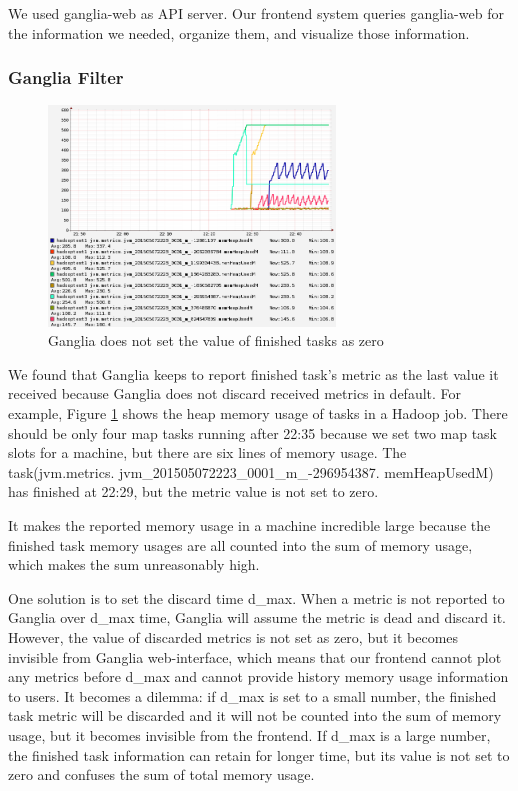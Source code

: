 We used ganglia-web as API server. Our frontend system queries ganglia-web for the information we needed, organize them, and visualize those information. 

\subsubsection{Ganglia Filter}

\begin{figure}[ht]
  \centering
    \includegraphics[width=3.0in]{image/ganglia_finished_tasks.png}
    \caption{Ganglia does not set the value of finished tasks as zero}
    \label{ref:gangliah_bug}
\end{figure}

We found that Ganglia keeps to report finished task's metric as the last value it received because Ganglia does not discard received metrics in default. For example, Figure \ref{ref:gangliah_bug} shows the heap memory usage of tasks in a Hadoop job. There should be only four map tasks running after 22:35 because we set two map task slots for a machine, but there are six lines of memory usage. The task(jvm.metrics. jvm\_201505072223\_0001\_m\_-296954387. memHeapUsedM) has finished at 22:29, but the metric value is not set to zero.

It makes the reported memory usage in a machine incredible large because the finished task memory usages are all counted into the sum of memory usage, which makes the sum unreasonably high. 

One solution is to set the discard time d\_max. When a metric is not reported to Ganglia over d\_max time, Ganglia will assume the metric is dead and discard it. However, the value of discarded metrics is not set as zero, but it becomes invisible from Ganglia web-interface, which means that our frontend cannot plot any metrics before d\_max and cannot provide history memory usage information to users. It becomes a dilemma: if d\_max is set to a small number, the finished task metric will be discarded and it will not be counted into the sum of memory usage, but it becomes invisible from the frontend. If d\_max is a large number, the finished task information can retain for longer time, but its value is not set to zero and confuses the sum of total memory usage.

